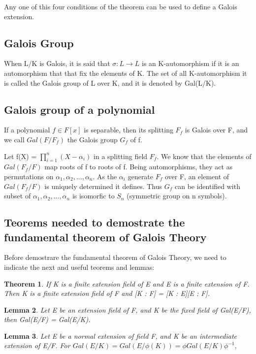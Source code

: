 \documentclass[a4paper, 10pt]{article}
\theoremstyle{plain}
\newtheorem{teorema}{Theorem}[section]
\newtheorem{lema}[teorema]{Lemma}
\theoremstyle{definition}
\theoremstyle{remark}
\begin{document}
	Any one of this four conditions of the theorem can be used to define a Galois extension. 
	
	

	
	\subsection{Galois Group}
		When L/K is Galois, it is said that $\sigma: L \rightarrow L$ is an K-automorphism if it is an automorphism that that fix the elements of K. The set of all K-automorphism it is called the Galois group of L over K, and it is denoted by Gal(L/K).
		
	\subsection{Galois group of a polynomial}
	If a polynomial $f\in F[x]$ is separable, then its splitting $F_f$ is Galois over F, and we call $Gal(F/F_f)$ the Galois group $G_f$  of f.
	
	Let f(X) = $\prod_{i=1}^{n}(X-\alpha_i)$ in a splitting field $F_f$. We know that the elements of $Gal(F_f/F)$ map roots of f to roots of f. Being automorphisms, they act as permutations on ${\alpha_1, \alpha_2, ..., \alpha_n}$. As the $\alpha_i$ generate $F_f$ over F, an element of $Gal(F_f/F)$ is uniquely determined it defines. Thus $G_f$ can be identified with subset of ${\alpha_1, \alpha_2, ..., \alpha_n}$ is isomorfic to $S_n$ (symmetric group on n symbols). 

    \subsection{Teorems needed to demostrate the fundamental theorem of Galois Theory}
	Before demostrare the fundamental theorem of Galois Theory, we need to indicate the next and useful teorems and lemmas:\\

\begin{teorema}\label{3.9}
    If K is a finite extension field of E and E is a finite extension of F. Then K is a finite extension field of F and [K : F] = [K : E][E : F].
\end{teorema}

\begin{lema}\label{4.3}
    Let E be an extension field of F, and K be the fixed field of Gal(E/F), then Gal(E/F) = Gal(E/K).
\end{lema}

\begin{lema}\label{4.4}
    Let E be a normal extension of field F, and K be an intermediate extension of E/F. For
$Gal(E/K) = Gal(E/  \phi  (K)) =  \phi  Gal(E/K) \phi ^{-1},$
\end{lema}
\end{document}
